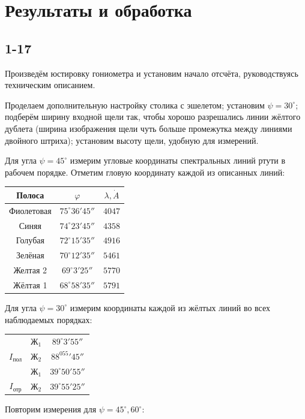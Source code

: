 \section*{Результаты и обработка}
\subsection{1-17}
Произведём юстировку гониометра и установим начало отсчёта, руководствуясь техническим описанием.

Проделаем дополнительную настройку столика с эшелетом; установим $\psi = 30^\circ$; подберём ширину входной щели так, чтобы хорошо разрешались линии жёлтого дублета (ширина изображения щели чуть больше промежутка между линиями двойного штриха); установим высоту щели, удобную для измерений.

Для угла $\psi = 45^\circ$ измерим угловые координаты спектральных линий ртути в рабочем порядке. Отметим гловую координату каждой из описанных линий:\\
\begin{center}
\begin{tabular}{|c|c|c|}  \hline
Полоса         & $\varphi          $ & $\lambda, \dot A$ \\\hline
Фиолетовая     & $75^\circ 36' 45''$ & $4047$ \\\hline
Синяя          & $74^\circ 23' 45''$ & $4358$ \\\hline
Голубая        & $72^\circ 15' 35''$ & $4916$ \\\hline
Зелёная        & $70^\circ 12' 35''$ & $5461$ \\\hline
Желтая 2       & $69^\circ 3 ' 25''$ & $5770$ \\\hline
Жёлтая 1       & $68^\circ 58' 35''$ & $5791$ \\\hline
\end{tabular}
\end{center}

Для угла $\psi = 30^\circ$ измерим координаты каждой из жёлтых линий во всех наблюдаемых порядках:

\begin{center}
\begin{tabular}{|c|c|c|} \hline
& $Ж_1$ & $89^\circ3'55''$ \\
\cline{2-3}
$I_{пол}$
& $Ж_2$ & $88^055'45''$ \\\hline
& $Ж_1$ & $39^\circ50'55''$ \\
\cline{2-3}
$I_{отр}$
& $Ж_2$ & $39^\circ55'25''$ \\\hline
\end{tabular}
\end{center}
Повторим измерения для $\psi = 45^\circ, 60^\circ$:
   
